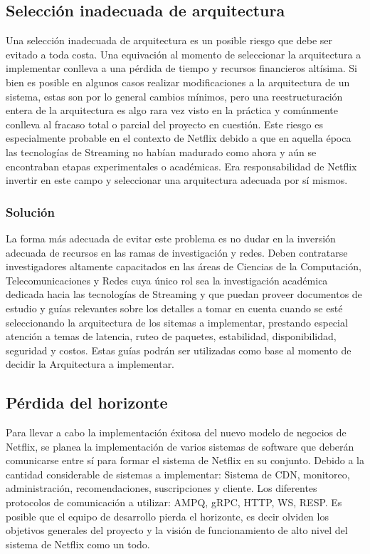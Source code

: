 \documentclass{article}
\begin{document}
\subsection{Selección inadecuada de arquitectura}
Una selección inadecuada de arquitectura es un posible riesgo que
debe ser evitado a toda costa. Una equivación al momento de
seleccionar la arquitectura a implementar conlleva a una pérdida
de tiempo y recursos financieros altísima. Si bien es posible en 
algunos casos realizar modificaciones a la arquitectura de un 
sistema, estas son por lo general cambios mínimos, pero una 
reestructuración entera de la arquitectura es algo rara vez visto
en la práctica y comúnmente conlleva al fracaso total o parcial
del proyecto en cuestión. Este riesgo es especialmente probable
en el contexto de Netflix debido a que en aquella época las 
tecnologías de Streaming no habían madurado como ahora y aún 
se encontraban etapas experimentales o académicas. Era responsabilidad
de Netflix invertir en este campo y seleccionar una arquitectura 
adecuada por sí mismos.
\subsubsection{Solución}
La forma más adecuada de evitar este problema es no dudar en la
inversión adecuada de recursos en las ramas de investigación y 
redes. Deben contratarse investigadores altamente capacitados en 
las áreas de Ciencias de la Computación, Telecomunicaciones y 
Redes cuya único rol sea la investigación académica dedicada 
hacia las tecnologías de Streaming y que puedan proveer 
documentos de estudio y guías relevantes sobre los detalles a 
tomar en cuenta cuando 
se esté seleccionando la arquitectura de los sitemas a implementar,
prestando especial atención a temas de latencia, ruteo de paquetes,
estabilidad, disponibilidad, seguridad y costos. Estas guías podrán
ser utilizadas como base al momento de decidir la Arquitectura 
a implementar.

\subsection{Pérdida del horizonte}
Para llevar a cabo la implementación éxitosa del nuevo modelo
de negocios de Netflix, se planea la implementación de varios
sistemas de software que deberán comunicarse entre sí para formar
el sistema de Netflix en su conjunto. Debido a la cantidad
considerable de sistemas a implementar: Sistema de CDN, monitoreo,
administración, recomendaciones, suscripciones y cliente. Los
diferentes protocolos de comunicación a utilizar: AMPQ, gRPC,
HTTP, WS, RESP. Es posible que el equipo de desarrollo pierda 
el horizonte, es decir olviden los objetivos generales del proyecto
y la visión de funcionamiento de alto nivel del sistema de Netflix
como un todo.
\end{document}
